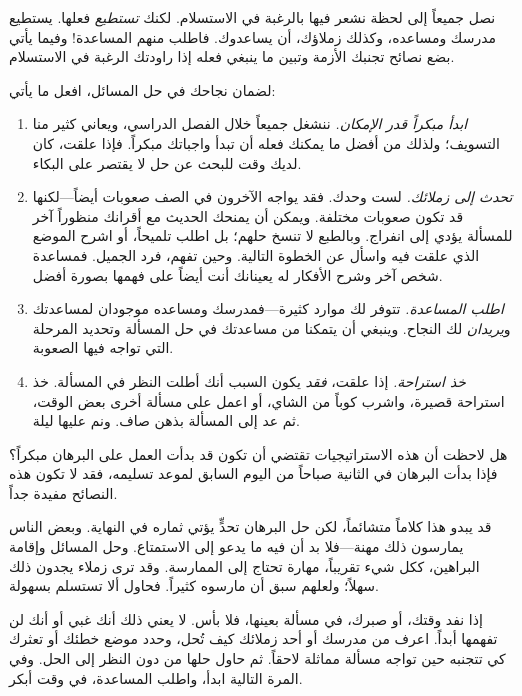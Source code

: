 \documentclass[../../../include/open-logic-section]{subfiles}
\begin{document}


نصل جميعاً إلى لحظة نشعر فيها بالرغبة في الاستسلام. لكنك
\emph{تستطيع} فعلها. يستطيع مدرسك ومساعده، وكذلك زملاؤك، أن يساعدوك.
فاطلب منهم المساعدة!{} وفيما يأتي بضع نصائح تجنبك الأزمة وتبين ما ينبغي
فعله إذا راودتك الرغبة في الاستسلام.

لضمان نجاحك في حل المسائل، افعل ما يأتي:
\begin{enumerate}
\item \emph{ابدأ مبكراً قدر الإمكان.} ننشغل جميعاً خلال الفصل الدراسي،
  ويعاني كثير منا التسويف؛ ولذلك من أفضل ما يمكنك فعله أن تبدأ واجباتك
  مبكراً. فإذا علقت، كان لديك وقت للبحث عن حل لا يقتصر على البكاء.
\item \emph{تحدث إلى زملائك.} لست وحدك. فقد يواجه الآخرون في الصف
  صعوبات أيضاً---لكنها قد تكون صعوبات مختلفة. ويمكن أن يمنحك الحديث مع
  أقرانك منظوراً آخر للمسألة يؤدي إلى انفراج. وبالطبع لا تنسخ حلهم؛ بل
  اطلب تلميحاً، أو اشرح الموضع الذي علقت فيه واسأل عن الخطوة التالية.
  وحين تفهم، فرد الجميل. فمساعدة شخص آخر وشرح الأفكار له يعينانك أنت
  أيضاً على فهمها بصورة أفضل.
\item \emph{اطلب المساعدة.} تتوفر لك موارد كثيرة---فمدرسك ومساعده
  موجودان لمساعدتك و\emph{يريدان} لك النجاح. وينبغي أن يتمكنا من
  مساعدتك في حل المسألة وتحديد المرحلة التي تواجه فيها الصعوبة.
\item \emph{خذ استراحة.} إذا علقت، \emph{فقد} يكون السبب أنك أطلت النظر
  في المسألة. خذ استراحة قصيرة، واشرب كوباً من الشاي، أو اعمل على مسألة
  أخرى بعض الوقت، ثم عد إلى المسألة بذهن صاف. ونم عليها ليلة.
\end{enumerate}

هل لاحظت أن هذه الاستراتيجيات تقتضي أن تكون قد بدأت العمل على البرهان
مبكراً؟ فإذا بدأت البرهان في الثانية صباحاً من اليوم السابق لموعد
تسليمه، فقد لا تكون هذه النصائح مفيدة جداً.

قد يبدو هذا كلاماً متشائماً، لكن حل البرهان تحدٍّ يؤتي ثماره في النهاية.
وبعض الناس يمارسون ذلك مهنة---فلا بد أن فيه ما يدعو إلى الاستمتاع. وحل
المسائل وإقامة البراهين، ككل شيء تقريباً، مهارة تحتاج إلى الممارسة. وقد
ترى زملاء يجدون ذلك سهلاً؛ ولعلهم سبق أن مارسوه كثيراً. فحاول ألا
تستسلم بسهولة.

إذا نفد وقتك، أو صبرك، في مسألة بعينها، فلا بأس. لا يعني ذلك أنك غبي أو
أنك لن تفهمها أبداً. اعرف من مدرسك أو أحد زملائك كيف تُحل، وحدد موضع
خطئك أو تعثرك كي تتجنبه حين تواجه مسألة مماثلة لاحقاً. ثم حاول حلها من
دون النظر إلى الحل. وفي المرة التالية ابدأ، واطلب المساعدة، في وقت
أبكر.
\end{document}
